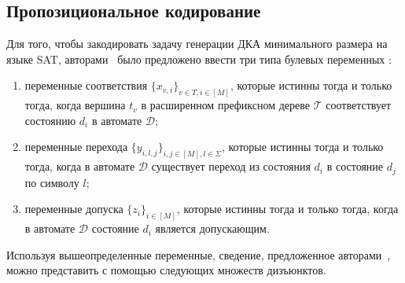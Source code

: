 \subsection{Пропозициональное кодирование}
\label{sec:review:sat-dfa-inf:hv-encoding}


Для того, чтобы закодировать задачу генерации ДКА минимального размера на языке SAT, авторами~\cite{heule-icgi10} было предложено ввести три типа булевых переменных :
\begin{enumerate}
  \item переменные соответствия $\{x_{v,i}\}_{v \in T, i \in \left[M\right]}$, которые истинны тогда и только тогда, когда вершина $t_{v}$ в расширенном префиксном дереве $\mathcal{T}$ соответствует состоянию $d_{i}$ в автомате $\mathcal{D}$;
  \item переменные перехода $\{y_{i,l,j}\}_{i,j \in \left[M\right],l \in \Sigma}$, которые истинны тогда и только тогда, когда в автомате $\mathcal{D}$ существует переход из состояния $d_{i}$ в состояние $d_{j}$ по символу $l$;
  \item переменные допуска $\{z_{i}\}_{i \in \left[M\right]}$, которые истинны тогда и только тогда, когда в автомате $\mathcal{D}$ состояние $d_{i}$ является допускающим.
\end{enumerate}

Используя вышеопределенные переменные, сведение, предложенное авторами~\cite{heule-icgi10}, можно представить с помощью следующих множеств дизъюнктов.



